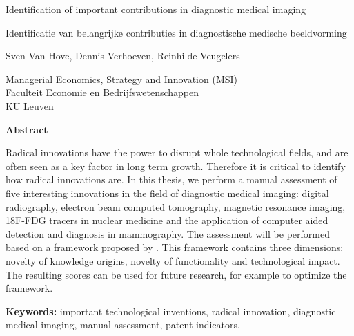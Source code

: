 
\cleardoublepage
\thispagestyle{plain}
\begin{center}
    \Huge 
    Identification of important contributions in diagnostic medical imaging
    
    \vspace{0.5cm}
    
    \large
    Identificatie van belangrijke contributies in diagnostische medische beeldvorming
    
    \vspace{1.0cm}
    
    Sven Van Hove, Dennis Verhoeven, Reinhilde Veugelers
    
    \vspace{0.5cm}
    
	Managerial Economics, Strategy and Innovation (MSI)\\
	Faculteit Economie en Bedrijfswetenschappen\\
	KU Leuven
    
    \vspace{1.0cm}
    \textbf{Abstract}
\end{center}

Radical innovations have the power to disrupt whole technological fields, and
are often seen as a key factor in long term growth. Therefore it is critical to
identify how radical innovations are. In this thesis, we perform a manual
assessment of five interesting innovations in the field of diagnostic medical
imaging: digital radiography, electron beam computed tomography, magnetic
resonance imaging, 18F-FDG tracers in nuclear medicine and the application of
computer aided detection and diagnosis in mammography. The assessment will be
performed based on a framework proposed by \cite{verhoeven}. This framework
contains three dimensions: novelty of knowledge origins, novelty of
functionality  and technological impact. The resulting scores can be used for
future research, for example to optimize the framework.

\vspace{1.0cm}

\textbf{Keywords:} important technological inventions, radical innovation,
diagnostic medical imaging, manual assessment, patent indicators.